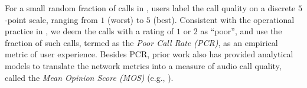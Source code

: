 For a small random fraction of calls in \skype, users label the
call quality on a discrete $5$-point scale, ranging from $1$ 
(worst) to $5$ (best). 
Consistent with the operational practice in \skype, we deem 
the calls with a rating of $1$ or $2$ as ``poor'', and use the 
fraction of such calls, termed as the {\em Poor Call Rate (PCR)}, 
as an empirical metric of user experience. 
Besides PCR, prior work also has provided analytical models to 
translate the network metrics into a measure of audio call quality, 
called the {\em Mean Opinion Score (MOS)} (e.g., \cite{cole}).


	
